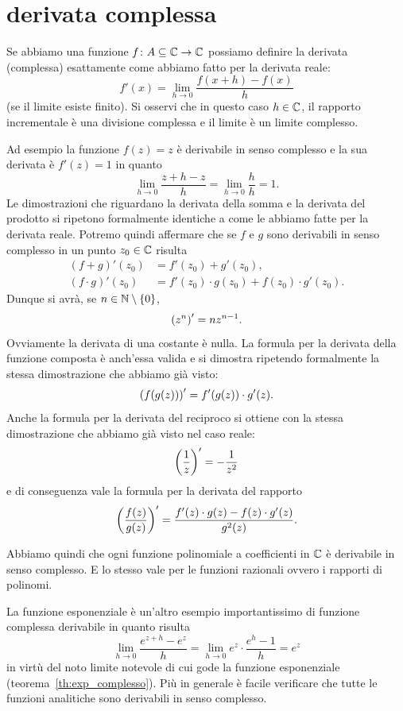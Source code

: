 \section{derivata complessa}
\label{sec:derivata_complessa}

Se abbiamo una funzione $f\colon A\subseteq {\mathbb C} \to {\mathbb C}$
possiamo definire la derivata (complessa) esattamente
come abbiamo fatto per la derivata reale:
\[
  f'(x) = \lim_{h\to 0} \frac{f(x+h)-f(x)}{h}
\]
(se il limite esiste finito).
Si osservi che in questo caso $h\in {\mathbb C}$,
il rapporto incrementale è una divisione complessa
e il limite è un limite complesso.

Ad esempio la funzione $f(z)=z$ è derivabile
in senso complesso e la sua derivata è $f'(z) = 1$
in quanto
\[
  \lim_{h\to 0} \frac{z+h-z}{h} = \lim_{h\to 0} \frac{h}{h}=1.
\]
Le dimostrazioni che riguardano la derivata della somma
e la derivata del prodotto si ripetono formalmente identiche
a come le abbiamo fatte per la derivata reale.
Potremo quindi affermare che se $f$ e $g$ sono derivabili
in senso complesso in un punto $z_0\in {\mathbb C}$ risulta
\begin{align*}
  (f+g)'(z_0) 
    &= f'(z_0) + g'(z_0), \\
  (f\cdot g)'(z_0) 
    &= f'(z_0)\cdot g(z_0) + f(z_0)\cdot g'(z_0).
\end{align*}
Dunque si avrà, se $n\in {\mathbb N}\setminus{\left\{ 0 \right\}}$,
\[
  {\left( z^n \right)}' = n z^{n-1}.
\]
Ovviamente la derivata di una costante è nulla.
La formula per la derivata della funzione composta è anch'essa valida 
e si dimostra ripetendo formalmente la stessa dimostrazione che
abbiamo già visto:
\[
  {\left( f(g(z)) \right)}'  = f'(g(z))\cdot g'(z).
\]
Anche la formula per la derivata del reciproco si ottiene
con la stessa dimostrazione che abbiamo già visto nel caso
reale:
\[
  {\left( \frac 1 z \right)}' = - \frac{1}{z^2}
\]
e di conseguenza vale la formula per la derivata del rapporto
\[
{\left( \frac{f(z)}{g(z)} \right)}' = \frac{f'(z)\cdot g(z) - f(z)\cdot g'(z)}{g^2(z)}.
\]

Abbiamo quindi che ogni funzione polinomiale a coefficienti in ${\mathbb C}$
è derivabile in senso complesso.
E lo stesso vale per le funzioni razionali ovvero i rapporti
di polinomi.

La funzione esponenziale è un'altro esempio importantissimo
di funzione complessa derivabile in quanto risulta
\[
  \lim_{h\to 0} \frac{e^{z+h}-e^z}{h}
  = \lim_{h\to 0} e^z \cdot \frac{e^h-1}{h} = e^z
\]
in virtù del noto limite notevole di cui
gode la funzione esponenziale
(teorema~\ref{th:exp_complesso}).
Più in generale è facile verificare che tutte le funzioni
analitiche sono derivabili in senso complesso.

